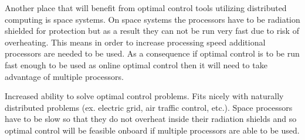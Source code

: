 \documentclass[12pt]{article}
\begin{document}
    Another place that will benefit from optimal control tools utilizing
distributed computing is space systems. On space systems the processors
have to be radiation shielded for protection but as a result they can not
be run very fast due to risk of overheating. This means in order to
increase processing speed additional processors are needed to be used. As a
consequence if optimal control is to be run fast enough to be used as online
optimal control then it will need to take advantage of multiple processors.

Increased ability to solve optimal control problems.
Fits nicely with naturally distributed problems (ex. electric grid, air traffic
control, etc.). Space processors have to be slow so that they do not overheat
inside their radiation shields and so optimal control will be feasible onboard
if multiple processors are able to be used.
\end{document}
